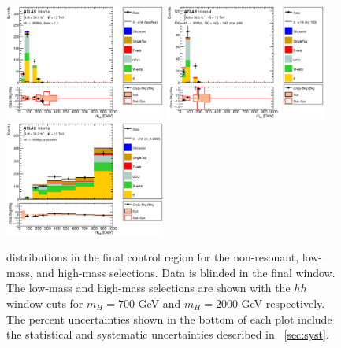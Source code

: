 \begin{figure}[!h]
\begin{center}
\includegraphics*[width=0.47\textwidth] {chapters/dihiggs2/figures/ControlPlots/36ifb_CPUpdated_optNoRes_mBBcr_plots_094/C_mBBcr_optNoRes_mww_bbpt150_bbpt230_drbb12_drww11_bbMass_regionA_met25d020}
\includegraphics*[width=0.47\textwidth] {chapters/dihiggs2/figures/ControlPlots/36ifb_CPUpdated_opt700_mBBcr_plots_094/C_mBBcr_opt700ichep_mww_bbpt150_drbb11_drww09_hh700_bbMass_regionA_met25d020}
\includegraphics*[width=0.47\textwidth] {chapters/dihiggs2/figures/ControlPlots/36ifb_CPUpdated_opt2000_mBBcr_plots_103/C_mBBcr_opt2000ichep_bbpt350_wwpt360_drww20_hh2000above_bbMass_regionA_met25d020}
\caption[\mbb distributions in the final \mbb control region for the non-resonant, low-mass, and high-mass selections. Data is blinded in the final \mbb window.]{\mbb distributions in the final \mbb control region for the non-resonant, low-mass, and high-mass selections. Data is blinded in the final \mbb window. The low-mass and high-mass selections are shown with the $hh$ window cuts for $m_H=700$ GeV and $m_H=2000$ GeV respectively. The percent uncertainties shown in the bottom of each plot include the statistical and systematic uncertainties described in ~\ref{sec:syst}.}
\label{fig:mbbCR1CR2}
\end{center}
\end{figure}

